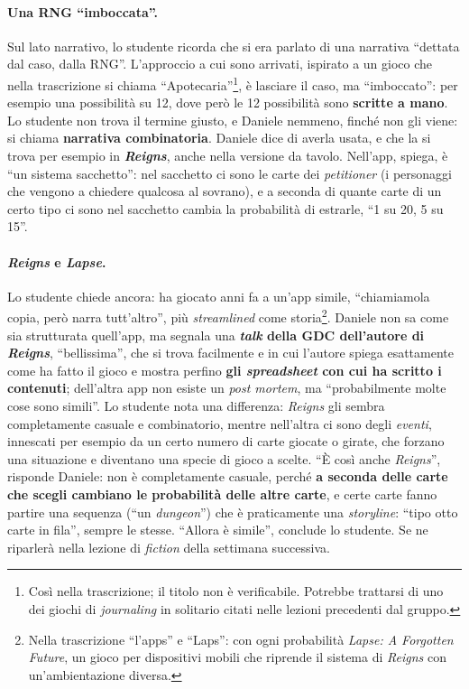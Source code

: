 \paragraph{Una RNG ``imboccata''.} Sul lato narrativo, lo studente ricorda che si era
parlato di una narrativa ``dettata dal caso, dalla RNG''. L'approccio a cui sono arrivati,
ispirato a un gioco che nella trascrizione si chiama ``Apotecaria''\footnote{Così nella
trascrizione; il titolo non è verificabile. Potrebbe trattarsi di uno dei giochi di
\emph{journaling} in solitario citati nelle lezioni precedenti dal gruppo.}, è lasciare
il caso, ma ``imboccato'': per esempio una possibilità su 12, dove però le 12
possibilità sono \textbf{scritte a mano}. Lo studente non trova il termine giusto, e
Daniele nemmeno, finché non gli viene: si chiama \textbf{narrativa combinatoria}. Daniele
dice di averla usata, e che la si trova per esempio in \textbf{\emph{Reigns}}, anche
nella versione da tavolo. Nell'app, spiega, è ``un sistema sacchetto'': nel sacchetto ci
sono le carte dei \emph{petitioner} (i personaggi che vengono a chiedere qualcosa al
sovrano), e a seconda di quante carte di un certo tipo ci sono nel sacchetto cambia la
probabilità di estrarle, ``1 su 20, 5 su 15''.

\paragraph{\emph{Reigns} e \emph{Lapse}.} Lo studente chiede ancora: ha giocato anni fa
a un'app simile, ``chiamiamola copia, però narra tutt'altro'', più \emph{streamlined}
come storia\footnote{Nella trascrizione ``l'apps'' e ``Laps'': con ogni probabilità
\emph{Lapse: A Forgotten Future}, un gioco per dispositivi mobili che riprende il sistema
di \emph{Reigns} con un'ambientazione diversa.}. Daniele non sa come sia strutturata
quell'app, ma segnala una \textbf{\emph{talk} della GDC dell'autore di \emph{Reigns}},
``bellissima'', che si trova facilmente e in cui l'autore spiega esattamente come ha
fatto il gioco e mostra perfino \textbf{gli \emph{spreadsheet} con cui ha scritto i
contenuti}; dell'altra app non esiste un \emph{post mortem}, ma ``probabilmente molte
cose sono simili''. Lo studente nota una differenza: \emph{Reigns} gli sembra
completamente casuale e combinatorio, mentre nell'altra ci sono degli \emph{eventi},
innescati per esempio da un certo numero di carte giocate o girate, che forzano una
situazione e diventano una specie di gioco a scelte. ``È così anche \emph{Reigns}'',
risponde Daniele: non è completamente casuale, perché \textbf{a seconda delle carte che
scegli cambiano le probabilità delle altre carte}, e certe carte fanno partire una
sequenza (``un \emph{dungeon}'') che è praticamente una \emph{storyline}: ``tipo otto
carte in fila'', sempre le stesse. ``Allora è simile'', conclude lo studente. Se ne
riparlerà nella lezione di \emph{fiction} della settimana successiva.

